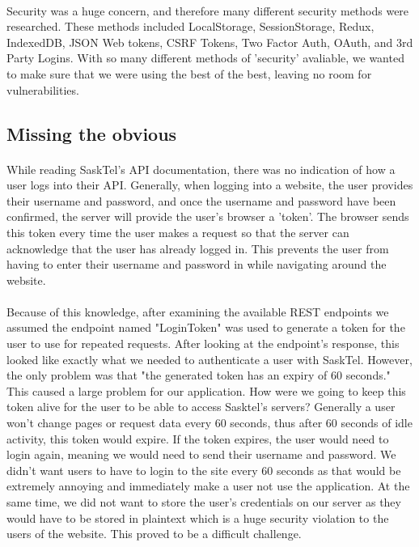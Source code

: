 \documentclass[12pt]{article}
\begin{document}
\paragraph{}	
	Security was a huge concern, and therefore many different security methods were researched. These methods included LocalStorage, SessionStorage, Redux, IndexedDB, JSON Web tokens, CSRF Tokens, Two Factor Auth, OAuth, and 3rd Party Logins. With so many different methods of 'security' avaliable, we wanted to make sure that we were using the best of the best, leaving no room for vulnerabilities.

\subsection{Missing the obvious}
\paragraph{}	
	While reading SaskTel's API documentation, there was no indication of how a user logs into their API. Generally, when logging into a website, the user provides their username and password, and once the username and password have been confirmed, the server will provide the user's browser a 'token'. The browser sends this token every time the user makes a request so that the server can acknowledge that the user has already logged in. This prevents the user from having to enter their username and password in while navigating around the website. 
\paragraph{}
	Because of this knowledge, after examining the available REST endpoints we assumed the endpoint named "LoginToken" was used to generate a token for the user to use for repeated requests. After looking at the endpoint's response, this looked like exactly what we needed to authenticate a user with SaskTel. However, the only problem was that "the generated token has an expiry of 60 seconds." This caused a large problem for our application. How were we going to keep this token alive for the user to be able to access Sasktel's servers? Generally a user won't change pages or request data every 60 seconds, thus after 60 seconds of idle activity, this token would expire. If the token expires, the user would need to login again, meaning we would need to send their username and password. We didn't want users to have to login to the site every 60 seconds as that would be extremely annoying and immediately make a user not use the application. At the same time, we did not want to store the user's credentials on our server as they would have to be stored in plaintext which is a huge security violation to the users of the website. This proved to be a difficult challenge. 
\end{document}
